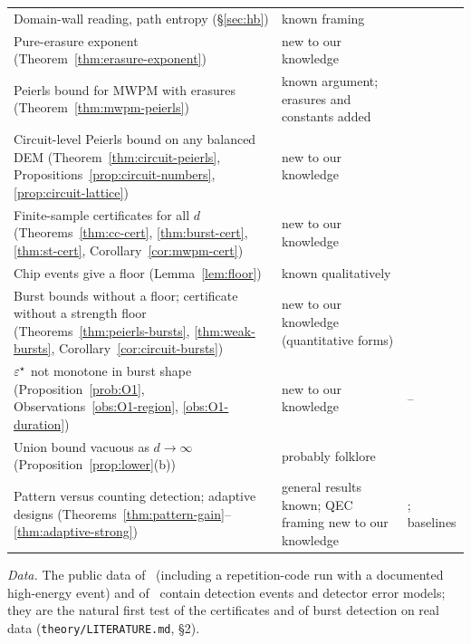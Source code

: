 {\begin{longtable}{p{5.6cm} p{3.0cm} p{5.6cm}}
Domain-wall reading, path entropy (\S\ref{sec:hb}) & known framing & \cite{DKLP,CF,WatsonBarrett,BBKM,English} \\
Pure-erasure exponent (Theorem~\ref{thm:erasure-exponent}) & new to our knowledge & \cite{SBD,Colmenarez} \\
Peierls bound for MWPM with erasures (Theorem~\ref{thm:mwpm-peierls}) & known argument; erasures and constants added & \cite{DKLP,KovalevPryadko} \\
Circuit-level Peierls bound on any balanced DEM (Theorem~\ref{thm:circuit-peierls}, Propositions~\ref{prop:circuit-numbers}, \ref{prop:circuit-lattice}) & new to our knowledge & \cite{Fowler,YLY,ChaiNg,KovalevPryadko,AGP} \\
Finite-sample certificates for all $d$ (Theorems~\ref{thm:cc-cert}, \ref{thm:burst-cert}, \ref{thm:st-cert}, Corollary~\ref{cor:mwpm-cert}) & new to our knowledge & \cite{Google22,Google24,BV,Mayer,Takou,Regev,Spitz,Google21} \\
Chip events give a floor (Lemma~\ref{lem:floor}) & known qualitatively & \cite{McEwen,Google22,Google24,XuChip,TPMP} \\
Burst bounds without a floor; certificate without a strength floor (Theorems~\ref{thm:peierls-bursts}, \ref{thm:weak-bursts}, Corollary~\ref{cor:circuit-bursts}) & new to our knowledge (quantitative forms) & \cite{TPMP,AKP,TerhalBurkard} \\
$\varepsilon^{\star}$ not monotone in burst shape (Proposition~\ref{prob:O1}, Observations~\ref{obs:O1-region}, \ref{obs:O1-duration}) & new to our knowledge & -- \\
Union bound vacuous as $d\to\infty$ (Proposition~\ref{prop:lower}(b)) & probably folklore & \cite{FVC,KPDP} \\
Pattern versus counting detection; adaptive designs (Theorems~\ref{thm:pattern-gain}--\ref{thm:adaptive-strong}) & general results known; QEC framing new to our knowledge & \cite{Chernoff59,Hayashi09,NAV}; baselines \cite{Q3DE,Vallero} \\
\bottomrule
\end{longtable}
}

\noindent\emph{Data.} The public data of~\cite{Google22} (including a repetition-code run with a documented high-energy event) and of~\cite{Google24} contain detection events and detector error models; they are the natural first test of the certificates and of burst detection on real data (\texttt{theory/LITERATURE.md}, \S2).

